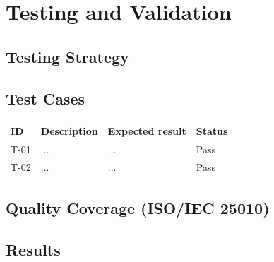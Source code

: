 \section{Testing and Validation}
\label{sec:testing}


\subsection{Testing Strategy}

\subsection{Test Cases}

\begin{center}
  \begin{tabular}{llll}
    \hline
    \textbf{ID} & \textbf{Description} & \textbf{Expected result} & \textbf{Status} \\
    \hline
    T-01 & ... & ... & Pass \\
    T-02 & ... & ... & Pass \\
    \hline
  \end{tabular}
\end{center}

\subsection{Quality Coverage (ISO/IEC 25010)}

\subsection{Results}
